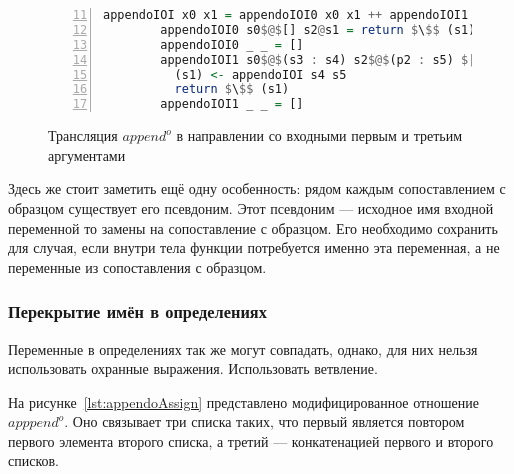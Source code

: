 \begin{figure}[h!]
  \begin{center}
  \begin{minipage}{0.9\textwidth}
  \begin{lstlisting}[language=Haskell, frame=single, numbers=left,numberstyle=\small, firstnumber=11, escapechar=|]
        appendoIOI x0 x1 = appendoIOI0 x0 x1 ++ appendoIOI1 x0 x1
        appendoIOI0 s0$@$[] s2@s1 = return $\$$ (s1)
        appendoIOI0 _ _ = []
        appendoIOI1 s0$@$(s3 : s4) s2$@$(p2 : s5) $|$ s3 == p2 = do
          (s1) <- appendoIOI s4 s5
          return $\$$ (s1)
        appendoIOI1 _ _ = []
    \end{lstlisting}
  \end{minipage}
  \end{center}
  \caption{Трансляция $append^o$ в направлении со входными первым и третьим аргументами}
  \label{lst:appendoIOITR}
\end{figure}

Здесь же стоит заметить ещё одну особенность: рядом каждым сопоставлением с образцом существует его псевдоним.
Этот псевдоним --- исходное имя входной переменной то замены на сопоставление с образцом.
Его необходимо сохранить для случая, если внутри тела функции потребуется именно эта переменная, а не переменные из сопоставления с образцом.


\subsubsection{Перекрытие имён в определениях}

Переменные в определениях так же могут совпадать, однако, для них нельзя использовать охранные выражения.
Использовать ветвление.

На рисунке~\ref{lst:appendoAssign} представлено модифицированное отношение $apppend^o$.
Оно связывает три списка таких, что первый является повтором первого элемента второго списка, а третий --- конкатенацией первого и второго списков.

